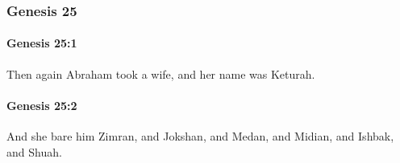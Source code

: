 	\subsubsection{Genesis 25} %
		\label{GENESIS-25}

		\paragraph{Genesis 25:1} %
			\label{GENESIS-25-1}

			Then again Abraham took a wife, and her name was Keturah.


		\paragraph{Genesis 25:2} %
			\label{GENESIS-25-2}

			And she bare him Zimran, and Jokshan, and Medan, and Midian, and Ishbak, and Shuah.

